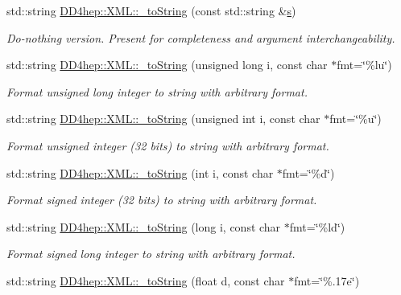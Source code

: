 \begin{DoxyCompactItemize}
std\+::string \hyperlink{group___d_d4_h_e_p___x_m_l_ga3cc667e7ad6da9a55052498695c44e27}{D\+D4hep\+::\+X\+M\+L\+::\+\_\+to\+String} (const std\+::string \&\hyperlink{_volumes_8cpp_a17ca6bfc8040d695d3cada22a4763d40}{s})
\begin{DoxyCompactList}\small\item\em Do-\/nothing version. Present for completeness and argument interchangeability. \end{DoxyCompactList}\item 
std\+::string \hyperlink{group___d_d4_h_e_p___x_m_l_ga52447f7eb531c40682ba02c1271c1030}{D\+D4hep\+::\+X\+M\+L\+::\+\_\+to\+String} (unsigned long i, const char $\ast$fmt=\char`\"{}\%lu\char`\"{})
\begin{DoxyCompactList}\small\item\em Format unsigned long integer to string with arbitrary format. \end{DoxyCompactList}\item 
std\+::string \hyperlink{group___d_d4_h_e_p___x_m_l_ga394251d8f037bcee0db303753aefc97b}{D\+D4hep\+::\+X\+M\+L\+::\+\_\+to\+String} (unsigned int i, const char $\ast$fmt=\char`\"{}\%u\char`\"{})
\begin{DoxyCompactList}\small\item\em Format unsigned integer (32 bits) to string with arbitrary format. \end{DoxyCompactList}\item 
std\+::string \hyperlink{group___d_d4_h_e_p___x_m_l_ga3db5e3893d601405e4881f4e59aab45a}{D\+D4hep\+::\+X\+M\+L\+::\+\_\+to\+String} (int i, const char $\ast$fmt=\char`\"{}\%d\char`\"{})
\begin{DoxyCompactList}\small\item\em Format signed integer (32 bits) to string with arbitrary format. \end{DoxyCompactList}\item 
std\+::string \hyperlink{group___d_d4_h_e_p___x_m_l_gab11cb9a1d8aa1ca280f2d88345983838}{D\+D4hep\+::\+X\+M\+L\+::\+\_\+to\+String} (long i, const char $\ast$fmt=\char`\"{}\%ld\char`\"{})
\begin{DoxyCompactList}\small\item\em Format signed long integer to string with arbitrary format. \end{DoxyCompactList}\item 
std\+::string \hyperlink{group___d_d4_h_e_p___x_m_l_ga5fe476c5280899829d9defb4386524a9}{D\+D4hep\+::\+X\+M\+L\+::\+\_\+to\+String} (float d, const char $\ast$fmt=\char`\"{}\%.\+17e\char`\"{})

\end{DoxyCompactItemize}

